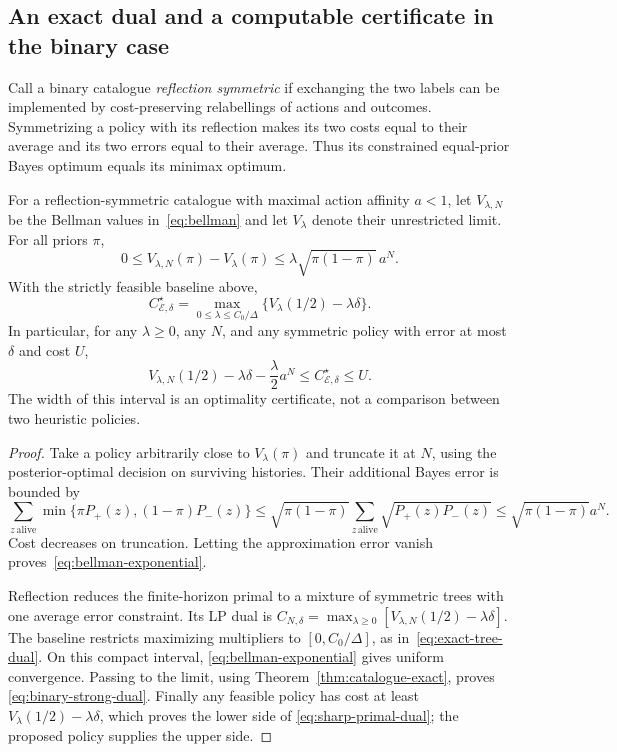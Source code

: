 \subsection{An exact dual and a computable certificate in the binary case}
Call a binary catalogue \emph{reflection symmetric} if exchanging the
two labels can be implemented by cost-preserving relabellings of actions
and outcomes. Symmetrizing a policy with its reflection makes its two
costs equal to their average and its two errors equal to their average.
Thus its constrained equal-prior Bayes optimum equals its minimax optimum.

\begin{theorem}
\label{thm:exact-binary-dual}
For a reflection-symmetric catalogue with maximal action affinity $a<1$,
let $V_{\lambda,N}$ be the Bellman values in~\eqref{eq:bellman} and let
$V_\lambda$ denote their unrestricted limit. For all priors $\pi$,
\begin{equation}\label{eq:bellman-exponential}
 0\leq V_{\lambda,N}(\pi)-V_\lambda(\pi)
 \leq\lambda\sqrt{\pi(1-\pi)}\,a^N.
\end{equation}
With the strictly feasible baseline above,
\begin{equation}\label{eq:binary-strong-dual}
 C_{\mathcal E,\delta}^\star
 =\max_{0\leq\lambda\leq C_0/\Delta}
       \{V_\lambda(1/2)-\lambda\delta\}.
\end{equation}
In particular, for any $\lambda\geq0$, any $N$, and any symmetric
policy with error at most $\delta$ and cost $U$,
\begin{equation}\label{eq:sharp-primal-dual}
 V_{\lambda,N}(1/2)-\lambda\delta-\frac\lambda2a^N
 \leq C_{\mathcal E,\delta}^\star\leq U.
\end{equation}
The width of this interval is an optimality certificate, not a comparison
between two heuristic policies.
\end{theorem}
\begin{proof}
Take a policy arbitrarily close to $V_\lambda(\pi)$ and truncate it at $N$,
using the posterior-optimal decision on surviving histories. Their additional
Bayes error is bounded by
\[
 \sum_{z\,\mathrm{alive}}\min\{\pi P_+(z),(1-\pi)P_-(z)\}
 \leq\sqrt{\pi(1-\pi)}
       \sum_{z\,\mathrm{alive}}\sqrt{P_+(z)P_-(z)}
 \leq\sqrt{\pi(1-\pi)}a^N.
\]
Cost decreases on truncation. Letting the approximation error vanish
proves~\eqref{eq:bellman-exponential}.

Reflection reduces the finite-horizon primal to a mixture of symmetric
trees with one average error constraint. Its LP dual is
$C_{N,\delta}=\max_{\lambda\geq0}
[V_{\lambda,N}(1/2)-\lambda\delta]$.
The baseline restricts maximizing multipliers to $[0,C_0/\Delta]$,
as in~\eqref{eq:exact-tree-dual}. On this compact interval,
\eqref{eq:bellman-exponential} gives uniform convergence. Passing to
the limit, using Theorem~\ref{thm:catalogue-exact}, proves
\eqref{eq:binary-strong-dual}. Finally any feasible policy has cost at least
$V_\lambda(1/2)-\lambda\delta$, which proves the lower side of
\eqref{eq:sharp-primal-dual}; the proposed policy supplies the upper side.
\end{proof}
